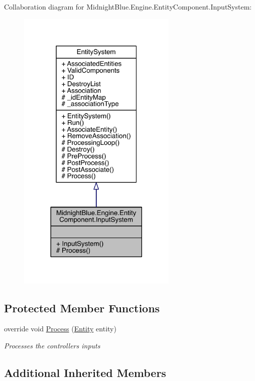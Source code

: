 Collaboration diagram for Midnight\+Blue.\+Engine.\+Entity\+Component.\+Input\+System\+:
\nopagebreak
\begin{figure}[H]
\begin{center}
\leavevmode
\includegraphics[width=216pt]{class_midnight_blue_1_1_engine_1_1_entity_component_1_1_input_system__coll__graph}
\end{center}
\end{figure}
\subsection*{Protected Member Functions}
\begin{DoxyCompactItemize}
\item 
override void \hyperlink{class_midnight_blue_1_1_engine_1_1_entity_component_1_1_input_system_a4aef070eb239e7328e6a61fee3e4d477}{Process} (\hyperlink{class_midnight_blue_1_1_engine_1_1_entity_component_1_1_entity}{Entity} entity)
\begin{DoxyCompactList}\small\item\em Processes the controllers inputs \end{DoxyCompactList}\end{DoxyCompactItemize}
\subsection*{Additional Inherited Members}


